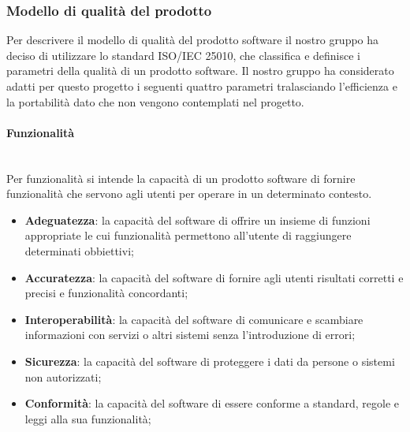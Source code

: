 \subsubsection{Modello di qualità del prodotto} 
Per descrivere il modello di qualità del prodotto software il nostro gruppo ha deciso di utilizzare lo standard ISO/IEC 25010, che classifica e definisce i parametri della qualità di un prodotto software. Il nostro gruppo ha considerato adatti per questo progetto i seguenti quattro parametri tralasciando l'efficienza e la portabilità dato che non vengono contemplati nel progetto.
	\paragraph{Funzionalità} \mbox{}\\
	Per funzionalità si intende la capacità di un prodotto software di fornire funzionalità che servono agli utenti per operare in un determinato contesto.
	\begin{itemize}
		\item \textbf{Adeguatezza}: la capacità del software di offrire un insieme di funzioni appropriate le cui funzionalità permettono all'utente di raggiungere determinati obbiettivi;
		\item \textbf{Accuratezza}: la capacità del software di fornire agli utenti risultati corretti e precisi e funzionalità concordanti;
		\item \textbf{Interoperabilità}: la capacità del software di comunicare e scambiare informazioni con servizi o altri sistemi senza l'introduzione di errori;
		\item \textbf{Sicurezza}: la capacità del software di proteggere i dati da persone o sistemi non autorizzati;
		\item \textbf{Conformità}: la capacità del software di essere conforme a standard, regole e leggi alla sua funzionalità;
	\end{itemize}
